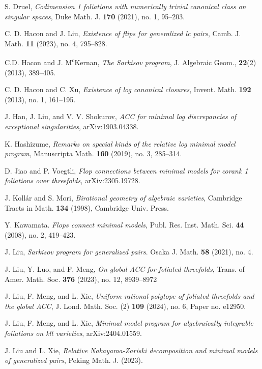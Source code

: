 \documentclass[11pt]{amsart}
\numberwithin{equation}{section}
\theoremstyle{definition}
\theoremstyle{definition}
\theoremstyle{definition}
\begin{document}
\begin{thebibliography}{99}
 S. Druel, \textit{Codimension 1 foliations with numerically trivial canonical class on singular spaces}, Duke Math. J. \textbf{170} (2021), no. 1, 95--203.

 C. D. Hacon and J. Liu, \textit{Existence of flips for generalized lc pairs}, Camb. J. Math. \textbf{11} (2023), no. 4, 795--828.  

 C.D. Hacon and J. M\textsuperscript{c}Kernan, \textit{The Sarkisov program}, J. Algebraic Geom., \textbf{22}(2) (2013), 389--405.

 C. D. Hacon and C. Xu, \textit{Existence of log canonical closures}, Invent. Math. \textbf{192} (2013), no. 1, 161--195.


 J. Han, J. Liu, and V. V. Shokurov, \textit{ACC for minimal log discrepancies of exceptional singularities}, arXiv:1903.04338.

 K. Hashizume, \textit{Remarks on special kinds of the relative log minimal model program}, Manuscripta Math. \textbf{160} (2019), no. 3, 285--314.

 D. Jiao and P. Voegtli, \textit{Flop connections between minimal models for
corank 1 foliations over threefolds}, arXiv:2305.19728.


 J. Koll\'{a}r and S. Mori, \textit{Birational geometry of algebraic varieties}, Cambridge Tracts in Math. \textbf{134} (1998), Cambridge Univ. Press.

 Y. Kawamata. \textit{Flops connect minimal models}, Publ. Res. Inst. Math. Sci. \textbf{44} (2008), no. 2, 419--423. 

 J. Liu, \textit{Sarkisov program for generalized pairs}.  Osaka J. Math. \textbf{58} (2021), no. 4.

 J. Liu, Y. Luo, and F. Meng, \textit{On global ACC for foliated threefolds},  Trans. of Amer. Math. Soc. \textbf{376} (2023), no. 12, 8939--8972

 J. Liu, F. Meng, and L. Xie, \textit{Uniform rational polytope of foliated threefolds and the global ACC}, J. Lond. Math. Soc. (2) \textbf{109} (2024), no. 6, Paper no. e12950.

 J. Liu, F. Meng, and L. Xie, \textit{Minimal model program for algebraically integrable foliations on klt varieties}, arXiv:2404.01559.

 J. Liu and L. Xie, \textit{Relative Nakayama-Zariski decomposition and minimal models of generalized pairs}, Peking Math. J. (2023).


\end{thebibliography}
\end{document}
